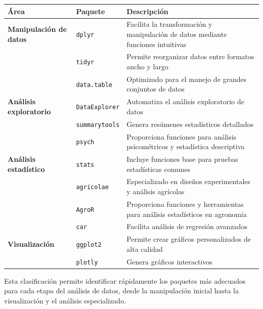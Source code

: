 \documentclass[
  spanish,
  a4paper,
  DIV=11,
  numbers=noendperiod,
  onepage,
  openany]{scrreprt}
\begin{document}
\begin{longtable}[]{@{}
  >{\raggedright\arraybackslash}p{}
  >{\raggedright\arraybackslash}p{}
  >{\raggedright\arraybackslash}p{}@{}}
\toprule\noalign{}
\begin{minipage}[b]{\linewidth}\raggedright
Área
\end{minipage} & \begin{minipage}[b]{\linewidth}\raggedright
Paquete
\end{minipage} & \begin{minipage}[b]{\linewidth}\raggedright
Descripción
\end{minipage} \\
\midrule\noalign{}
\endhead
\bottomrule\noalign{}
\endlastfoot
\textbf{Manipulación de datos} & \texttt{dplyr} & Facilita la
transformación y manipulación de datos mediante funciones intuitivas \\
& \texttt{tidyr} & Permite reorganizar datos entre formatos ancho y
largo \\
& \texttt{data.table} & Optimizado para el manejo de grandes conjuntos
de datos \\
\textbf{Análisis exploratorio} & \texttt{DataExplorer} & Automatiza el
análisis exploratorio de datos \\
& \texttt{summarytools} & Genera resúmenes estadísticos detallados \\
& \texttt{psych} & Proporciona funciones para análisis psicométricos y
estadística descriptiva \\
\textbf{Análisis estadístico} & \texttt{stats} & Incluye funciones base
para pruebas estadísticas comunes \\
& \texttt{agricolae} & Especializado en diseños experimentales y
análisis agrícolas \\
& \texttt{AgroR} & Proporciona funciones y herramientas para análisis
estadísticos en agronomía \\
& \texttt{car} & Facilita análisis de regresión avanzados \\
\textbf{Visualización} & \texttt{ggplot2} & Permite crear gráficos
personalizados de alta calidad \\
& \texttt{plotly} & Genera gráficos interactivos \\
\end{longtable}

Esta clasificación permite identificar rápidamente los paquetes más
adecuados para cada etapa del análisis de datos, desde la manipulación
inicial hasta la visualización y el análisis especializado.
\end{document}
